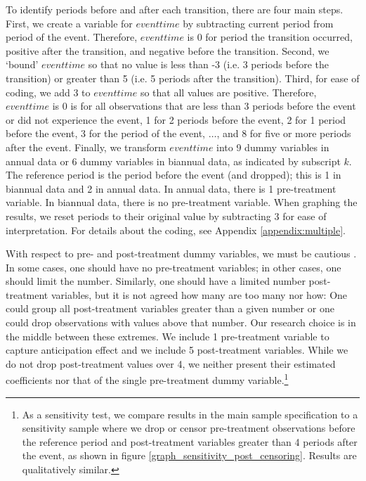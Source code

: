 \documentclass[12pt]{article}
\begin{document}
To identify periods before and after each transition, there are four main steps.  First, we create a variable for $eventtime$ by subtracting current period from period of the event.  Therefore, $eventtime$ is 0 for period the transition occurred, positive after the transition, and negative before the transition.  Second, we `bound' $eventtime$ so that no value is less than -3 (i.e. 3 periods before the transition) or greater than 5 (i.e. 5 periods after the transition).  Third, for ease of coding, we add 3 to $eventtime$ so that all values are positive.  Therefore, $eventtime$ is 0 is for all observations that are less than 3 periods before the event or did not experience the event, 1 for 2 periods before the event, 2 for 1 period before the event, 3 for the period of the event, $\dots$, and 8 for five or more periods after the event.  Finally, we transform $eventtime$ into 9 dummy variables in annual data or 6 dummy variables in biannual data, as indicated by subscript $k$.  The reference period is the period before the event (and dropped); this is 1 in biannual data and 2 in annual data.  In annual data, there is 1 pre-treatment variable.  In biannual data, there is no pre-treatment variable.  When graphing the results, we reset periods to their original value by subtracting 3 for ease of interpretation.  For details about the coding, see Appendix \ref{appendix:multiple}.  

With respect to pre- and post-treatment dummy variables, we must be cautious \citep{ludwig_is_2018,ludwig_what_2021}.  In some cases, one should have no pre-treatment variables; in other cases, one should limit the number.    Similarly, one should have a limited number post-treatment variables, but it is not agreed how many are too many nor how: One could group all post-treatment variables greater than a given number or one could drop observations with values above that number.  Our research choice is in the middle between these extremes.  We include 1 pre-treatment variable to capture anticipation effect and we include 5 post-treatment variables.  While we do not drop post-treatment values over 4, we neither present their estimated coefficients nor that of the single pre-treatment dummy variable.\footnote{As a sensitivity test, we compare results in the main sample specification to a sensitivity sample where we drop or censor pre-treatment observations before the reference period and post-treatment variables greater than 4 periods after the event, as shown in figure \ref{graph_sensitivity_post_censoring}.  Results are qualitatively similar.}
\end{document}

